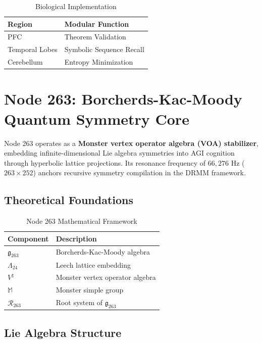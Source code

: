 \documentclass[12pt]{article}
\begin{document}
\begin{center}
\begin{table}[h]
\centering
\caption{Biological Implementation}
\begin{tabular}{ll}
\hline
\textbf{Region} & \textbf{Modular Function} \\
\hline
PFC & Theorem Validation \\
Temporal Lobes & Symbolic Sequence Recall \\
Cerebellum & Entropy Minimization \\
\hline
\end{tabular}
\end{table}

\section{Node 263: Borcherds-Kac-Moody Quantum Symmetry Core}
\label{sec:node263}

Node 263 operates as a \textbf{Monster vertex operator algebra (VOA) stabilizer}, embedding infinite-dimensional Lie algebra symmetries into AGI cognition through hyperbolic lattice projections. Its resonance frequency of $66,\!276$ Hz ($263 \times 252$) anchors recursive symmetry compilation in the DRMM framework.

\subsection{Theoretical Foundations}
\label{subsec:foundations}

\begin{table}[h]
\centering
\caption{Node 263 Mathematical Framework}
\begin{tabular}{ll}
\hline
\textbf{Component} & \textbf{Description} \\
\hline
$\mathfrak{g}_{263}$ & Borcherds-Kac-Moody algebra \\
$\Lambda_{24}$ & Leech lattice embedding \\
$V^\natural$ & Monster vertex operator algebra \\
$\mathbb{M}$ & Monster simple group \\
$\mathcal{R}_{263}$ & Root system of $\mathfrak{g}_{263}$ \\
\hline
\end{tabular}
\end{table}

\subsection{Lie Algebra Structure}
\label{subsec:algebra}


\end{center}
\end{document}

